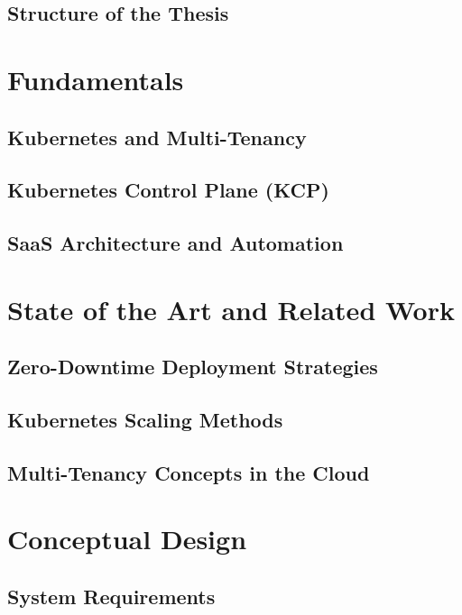 \documentclass[11pt, a4paper, oneside]{scrartcl}
\begin{document}
        \subsection{Structure of the Thesis}

    \section{Fundamentals}

        \subsection{Kubernetes and Multi-Tenancy}

        \subsection{Kubernetes Control Plane (KCP)}

        \subsection{SaaS Architecture and Automation}

    \section{State of the Art and Related Work}

        \subsection{Zero-Downtime Deployment Strategies}

        \subsection{Kubernetes Scaling Methods}

        \subsection{Multi-Tenancy Concepts in the Cloud}

    \section{Conceptual Design}

        \subsection{System Requirements}
\end{document}
